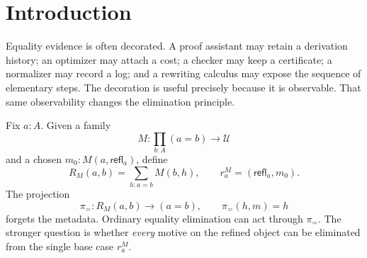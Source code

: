 \documentclass[10pt,reqno]{amsart}
\newcommand{\U}{\mathcal U}
\newcommand{\refl}{\mathsf{refl}}
\newcommand{\List}{\mathsf{List}}
\newcommand{\proj}{\pi_{=}}
\newcommand{\PRW}{\mathsf{PathRwQuot}}
\begin{document}
\begin{abstract}
We close by auditing the computational-path examples.  The reflexivity fiber of
the raw trace record is computed exactly---it is \(\List(A)\)---so failure there
is unconditional on every pointed carrier, in sharp contrast with the quotient.
The current ``circle'' is a one-constructor inductive type and the current
``torus'' its product; their genuine \(\PRW\) loop quotients are contractible,
while the separately defined winding-expression quotients are equivalent to
\(\mathbb Z\) and \(\mathbb Z^2\), and the collapse theorem upgrades the
resulting no-bridge statement from those two carriers to all of them.  A Lean
development verifies every result using only propositional extensionality and
quotient soundness.  The scope throughout is proof-irrelevant ambient equality,
not full Martin-L\"of or homotopy type theory; the pointed-family equivalence
underlying the criterion is the proof-irrelevant, propositional-beta
specialization of the identity-system characterization of
\cite[Thm.~5.8.2]{HoTTBook2013} and is not claimed as a contribution.
\end{abstract}

\maketitle

\section{Introduction}
\label{sec:introduction}

Equality evidence is often decorated.  A proof assistant may retain a
derivation history; an optimizer may attach a cost; a checker may keep a
certificate; a normalizer may record a log; and a rewriting calculus may expose
the sequence of elementary steps.  The decoration is useful precisely because
it is observable.  That same observability changes the elimination principle.

Fix \(a:A\).  Given a family
\[
        M:\prod_{b:A}(a=b)\longrightarrow\U
\]
and a chosen \(m_0:M(a,\refl_a)\), define
\[
 R_M(a,b)=\sum_{h:a=b}M(b,h),
 \qquad r^M_a=(\refl_a,m_0).
\tag{1.1}\label{eq:refinement}
\]
The projection
\[
       \proj:R_M(a,b)\longrightarrow(a=b),\qquad
       \proj(h,m)=h
\tag{1.2}\label{eq:projection}
\]
forgets the metadata.  Ordinary equality elimination can act through
\(\proj\).  The stronger question is whether \emph{every} motive on the
refined object can be eliminated from the single base case \(r^M_a\).
\end{document}
